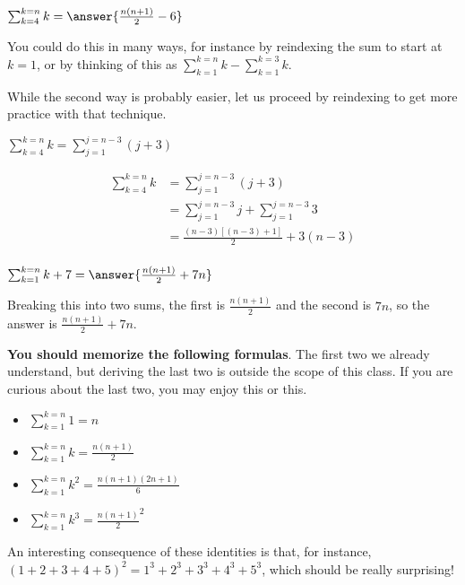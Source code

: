 \documentclass{ximera}
\begin{document}
\begin{question}
	$\sum_{k=4}^{k=n} k = \answer{ \frac{n(n+1)}{2} - 6}$
		\begin{hint}
			You could do this in many ways, for instance by reindexing the sum to start at $k=1$, or by thinking of this as $\sum_{k=1}^{k=n} k -\sum_{k=1}^{k=3} k $.
		\end{hint}
		\begin{hint}
			While the second way is probably easier, let us proceed by reindexing to get more practice with that technique.
			
			$\sum_{k=4}^{k=n} k  =\sum_{j=1}^{j=n-3} (j+3)$
		\end{hint}
		\begin{hint}
			\begin{align*}
				\sum_{k=4}^{k=n} k  &= \sum_{j=1}^{j=n-3} (j+3)\\
				&= \sum_{j=1}^{j=n-3} j + \sum_{j=1}^{j=n-3} 3\\
				&= \frac{(n-3)[(n-3)+1]}{2} + 3(n-3)\\
			\end{align*}
		\end{hint}
\end{question}

\begin{question}
	$\sum_{k=1}^{k=n} k+7  = \answer{ \frac{n(n+1)}{2} +7n}$
	\begin{hint}
		Breaking this into two sums, the first is $\frac{n(n+1)}{2}$ and the second is $7n$, so the answer is $\frac{n(n+1)}{2} +7n$.
	\end{hint}
\end{question}

\textbf{You should memorize the following formulas}. The first two we already understand, but deriving the last two is outside the scope of this class.  If you are curious about the last two, you may enjoy this or this.

\begin{theorem}
\begin{itemize}
	\item $\sum_{k=1}^{k=n} 1 = n$
	\item $\sum_{k=1}^{k=n} k = \frac{n(n+1)}{2}$
	\item $ \sum_{k=1}^{k=n} k^2 = \frac{n(n+1)(2n+1)}{6}$
	\item $\sum_{k=1}^{k=n} k^3 = \frac{n(n+1)}{2}^2$
\end{itemize}
\end{theorem}

An interesting consequence of these identities is that, for instance, $(1+2+3+4+5)^2 = 1^3+2^3+3^3+4^3+5^3$, which should be really surprising!
\end{document}
